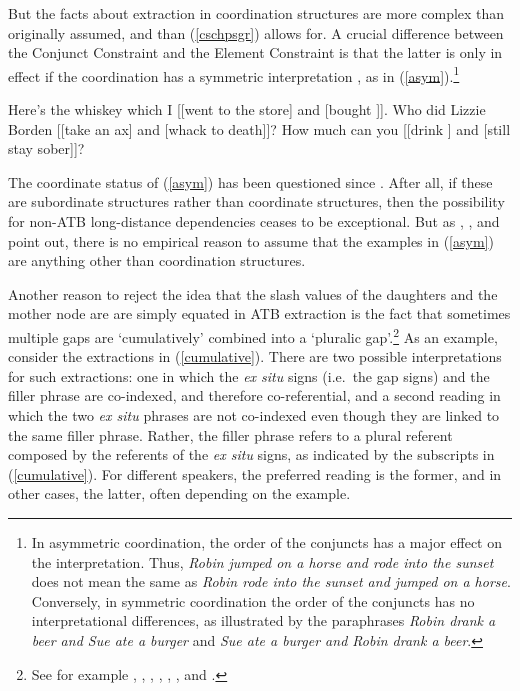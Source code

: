 \documentclass[output=paper
	        ,collection
	        ,collectionchapter
 	        ,biblatex
                ,babelshorthands
                ,newtxmath
                ,draftmode
                ,colorlinks, citecolor=brown
]{langscibook}
\begin{document}
But the facts about extraction in coordination structures are more complex than originally assumed, and than (\ref{cschpsgr}) allows for. A crucial  difference between the Conjunct Constraint and the Element Constraint is  that the latter is only in effect if the coordination has a symmetric interpretation  \citep{Ross67,goldsmith,lakoff86,levinprince86}, as in  (\ref{asym}).\footnote{In asymmetric coordination, the order of the conjuncts has a major effect on the interpretation.
  Thus, \emph{Robin jumped on a horse and rode into the sunset} does not 
mean the same as  \emph{Robin rode into the sunset and jumped on a horse}. Conversely,
in symmetric coordination the order of the conjuncts has no interpretational  differences,
as illustrated by the paraphrases \emph{Robin drank a beer and Sue ate a burger}
and \emph{Sue ate a burger and Robin drank a beer}.}


\eal  \label{asym}
\ex
 Here's the whiskey  which I [[went to the store] and [bought \spc]].
\ex Who did Lizzie Borden [[take an ax] and [whack \spcs to death]]?
\ex How much can you [[drink \spc] and [still stay sober]]?
\zl


\noindent
The coordinate status of (\ref{asym}) has been questioned since \cite{Ross67}. After all, if these are subordinate structures rather than coordinate structures, then the possibility for non-ATB long-distance dependencies ceases to be exceptional. But as 
\citet{schmerling72},  \citet{lakoff86}, \citet{levinepostal} and \citet{kehler}  point out,  there is no empirical reason to assume that the examples in (\ref{asym}) are anything other than coordination structures. 

Another reason to reject the idea that  the {\sc slash} values of the daughters and the mother node are are simply equated in ATB extraction is the fact that sometimes multiple gaps are `cumulatively' combined into a `pluralic gap'.\footnote{See for example  \citet{munn98atb,munn99atb},  \citet[136, 160]{postal98},
    \citet[125]{kehler},
 \citet{gawronkehlersalt}, 
 \citet{zhang}, \citet{chavessubjexp}, and \citet{Vicente2016-NELS46}.}
As an example, consider the extractions in (\ref{cumulative}). There are two possible interpretations
for such extractions: one in which the \emph{ex situ} signs (i.e.\ the gap signs) and the filler phrase are co-indexed, and therefore co-referential, and a second reading in which the two \emph{ex situ} phrases are not co-indexed even though they are linked to the same filler phrase.  Rather, the filler phrase refers to a plural
 referent composed by the referents of the \emph{ex situ} signs, as indicated by the subscripts 
in (\ref{cumulative}). For different speakers, the preferred reading is the former, and in other cases,
the latter, often depending on the example.
\end{document}
